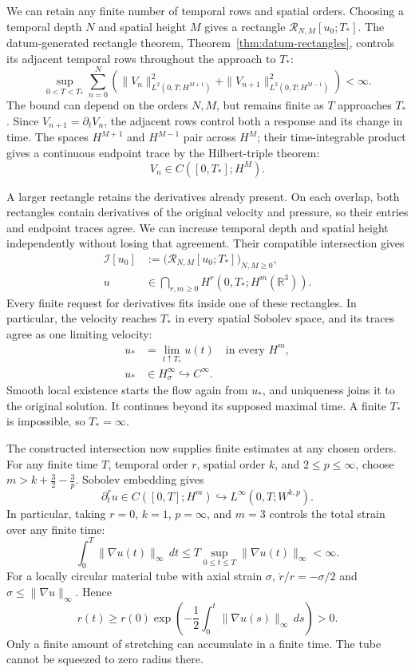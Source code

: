 We can retain any finite number of temporal rows and spatial orders.
Choosing a temporal depth \(N\) and spatial height \(M\) gives a rectangle
\(\mathcal R_{N,M}[u_0;T_*]\). The datum-generated rectangle theorem,
Theorem~\ref{thm:datum-rectangles}, controls its adjacent temporal rows
throughout the approach to \(T_*\):
\[
 \sup_{0<T<T_*}\sum_{n=0}^{N}\left(
 \|V_n\|_{L^2(0,T;H^{M+1})}^2
 +\|V_{n+1}\|_{L^2(0,T;H^{M-1})}^2
 \right)<\infty.
\]
The bound can depend on the orders \(N,M\), but remains finite as
\(T\) approaches \(T_*\). Since \(V_{n+1}=\partial_tV_n\), the
adjacent rows control both a response and its change in time. The spaces
\(H^{M+1}\) and \(H^{M-1}\) pair across \(H^M\); their time-integrable
product gives a continuous endpoint trace by the Hilbert-triple theorem:
\[
 V_n\in C([0,T_*];H^M).
\]

A larger rectangle retains the derivatives already present. On each
overlap, both rectangles contain derivatives of the original velocity and
pressure, so their entries and endpoint traces agree. We can increase
temporal depth and spatial height independently without losing that
agreement. Their compatible intersection gives
\[
 \begin{aligned}
 \mathcal I[u_0]
 &:=\bigl(\mathcal R_{N,M}[u_0;T_*]\bigr)_{N,M\ge0},\\
 u&\in\bigcap_{r,m\ge0}H^r(0,T_*;H^m(\mathbb R^3)).
 \end{aligned}
\]
Every finite request for derivatives fits inside one of these rectangles.
In particular, the velocity reaches \(T_*\) in every spatial Sobolev
space, and its traces agree as one limiting velocity:
\[
 \begin{aligned}
 u_*&=\lim_{t\uparrow T_*}u(t)\quad\text{in every }H^m,\\
 u_*&\in H^\infty_\sigma\hookrightarrow C^\infty.
 \end{aligned}
\]
Smooth local existence starts the flow again from \(u_*\), and uniqueness
joins it to the original solution. It continues beyond its supposed
maximal time. A finite \(T_*\) is impossible, so \(T_*=\infty\).

The constructed intersection now supplies finite estimates at any chosen
orders. For any finite time \(T\), temporal order \(r\), spatial order
\(k\), and \(2\le p\le\infty\), choose
\(m>k+\tfrac32-\tfrac3p\). Sobolev embedding gives
\[
 \partial_t^ru\in C([0,T];H^m)
 \hookrightarrow L^\infty(0,T;W^{k,p}).
\]
In particular, taking \(r=0\), \(k=1\), \(p=\infty\), and \(m=3\)
controls the total strain over any finite time:
\[
 \int_0^T\|\nabla u(t)\|_\infty\,dt
 \le T\sup_{0\le t\le T}\|\nabla u(t)\|_\infty<\infty.
\]
For a locally circular material tube with axial strain \(\sigma\),
\(\dot r/r=-\sigma/2\) and \(\sigma\le\|\nabla u\|_\infty\). Hence
\[
 r(t)\ge r(0)\exp\!\left(
 -\frac12\int_0^t\|\nabla u(s)\|_\infty\,ds
 \right)>0.
\]
Only a finite amount of stretching can accumulate in a finite time.
The tube cannot be squeezed to zero radius there.

\endgroup
